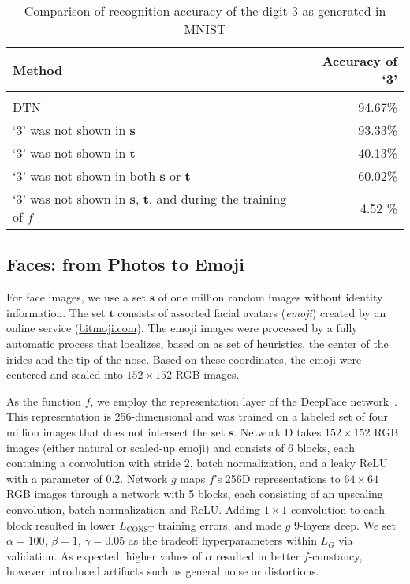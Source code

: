 \documentclass{article} \usepackage{iclr2017_conference,times}
\begin{document}
\begin{table}[t]
\caption{Comparison of recognition accuracy of the digit 3 as generated in MNIST}
\label{tab:compare3}
\begin{center}
\begin{tabular}{lr}
Method & Accuracy of `3'\\ \hline \\
DTN & 94.67\%   \\
`3' was not shown in $\mathbf s$            & 93.33\%  \\
`3' was not shown in $\mathbf t$             &  40.13\% \\
`3' was not shown in both $\mathbf s$ or $\mathbf t$     & 60.02\%   \\
`3' was not shown in $\mathbf s$, $\mathbf t$, and during the training of $f$ & 4.52 \%  \\
\hline
\end{tabular}
\end{center}
\end{table}

\subsection{Faces: from Photos to Emoji}

For face images, we use a set $\mathbf s$ of one million random images without identity information. The set $\mathbf t$ consists of assorted facial avatars ({\it emoji}) created by an online service (\url{bitmoji.com}). The emoji images were processed by a fully automatic process that localizes, based on as set of heuristics, the center of the irides and the tip of the nose. Based on these coordinates, the emoji were centered and scaled into $152 \times 152$ RGB images.

As the function $f$, we employ the representation layer of the DeepFace network~\cite{deepface}. This representation is 256-dimensional and was trained on a labeled set of four million images that does not intersect the set $\mathbf s$. Network D takes $152 \times 152$ RGB images (either natural or scaled-up emoji) and consists of 6 blocks, each containing a convolution with stride 2, batch normalization, and a leaky ReLU with a parameter of 0.2. Network $g$ maps $f$'s 256D representations to $64 \times 64$ RGB images through a network with 5 blocks, each consisting of an upscaling convolution, batch-normalization and ReLU. Adding $1 \times 1$ convolution to each block resulted in lower $L_\text{CONST}$ training errors, and made $g$ 9-layers deep. We set $\alpha = 100$, $\beta = 1$, $\gamma = 0.05$ as the tradeoff hyperparameters within $L_G$ via validation. As expected, higher values of $\alpha$ resulted in better $f$-constancy, however introduced artifacts such as general noise or distortions. 
\end{document}
